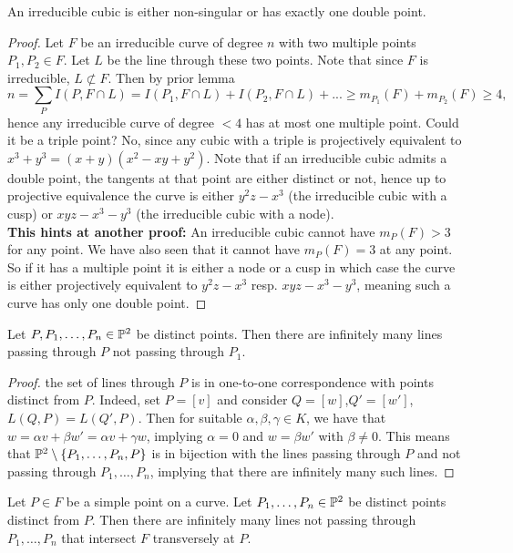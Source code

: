     \begin{proposition}
        An irreducible cubic is either non-singular or has exactly one double point.
    \end{proposition}
    \begin{proof}
        Let $F$ be an irreducible curve of degree $n$ with two multiple points $P_1,P_2\in F$. Let $L$ be the line through these two points. Note that since $F$ is irreducible, $L\not\subset F$. Then by prior lemma 
        $$n=\sum_P I(P,F\cap L)= I(P_1,F\cap L) + I(P_2,F\cap L)+...\geq m_{P_1}(F)+m_{P_2}(F)\geq 4,$$
        hence any irreducible curve of degree $<4$ has at most one multiple point. Could it be a triple point? No, since any cubic with a triple is projectively equivalent to $x^3+y^3=(x+y)(x^2-xy+y^2)$. Note that if an irreducible cubic admits a double point, the tangents at that point are either distinct or not, hence up to projective equivalence the curve is either $y^2z-x^3$ (the irreducible cubic with a cusp) or $xyz-x^3-y^3$ (the irreducible cubic with a node).\\
        \textbf{This hints at another proof:} An irreducible cubic cannot have $m_P(F)>3$ for any point. We have also seen that it cannot have $m_P(F)=3$ at any point. So if it has a multiple point it is either a node or a cusp in which case the curve is either projectively equivalent to $y^2z-x^3$ resp. $xyz-x^3-y^3$, meaning such a curve has only one double point. 
    \end{proof}
    \begin{lemma}
        Let $P,P_1,\dots,P_n\in \mathbb{P}^2$ be distinct points. Then there are infinitely many lines passing through $P$ not passing through $P_1$.
    \end{lemma}
    \begin{proof}
        the set of lines through $P$ is in one-to-one correspondence with points distinct from $P$. Indeed, set $P=[v]$ and consider $Q=[w]$,$Q'=[w']$, $L(Q,P)=L(Q',P)$. Then for suitable $\alpha,\beta,\gamma\in K$, we have that $w = \alpha v+\beta w'=\alpha v+ \gamma w$, implying $\alpha =0$ and $w = \beta w'$ with $\beta \neq 0$. This means that $\mathbb{P}^2\setminus \{P_1,\dots,P_n,P\}$ is in bijection with the lines passing through $P$ and not passing through $P_1,\dots,P_n$, implying that there are infinitely many such lines. 
    \end{proof}
    \begin{remark}
        Let $P\in F$ be a simple point on a curve. Let $P_1,\dots,P_n\in \mathbb{P}^2$ be distinct points distinct from $P$. Then there are infinitely many lines not passing through $P_1,\dots,P_n$ that intersect $F$ transversely at $P$. 
    \end{remark}
